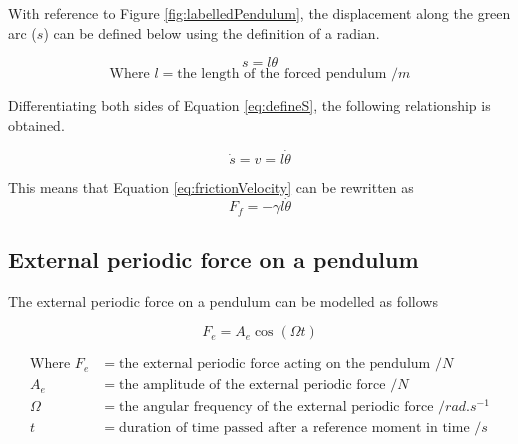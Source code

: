 \documentclass[letterpaper, 12pt]{article}
\begin{document}



With reference to Figure \ref*{fig:labelledPendulum}, the
displacement along the green arc (\(s\)) can be defined
below using the definition of a radian.

\begin{equation} \label{eq:defineS}
    s = l\theta
\end{equation}
\[
    \text{Where } l = \text{the length of the forced pendulum } /\unit{m}
\]

Differentiating both sides of Equation \ref*{eq:defineS},
the following relationship is obtained.

\begin{equation}
    \dot s = v = l \dot \theta
\end{equation}

This means that Equation \ref*{eq:frictionVelocity} can be rewritten as
\begin{equation}
    F_f = -\gamma l \dot\theta
\end{equation}

\subsection{External periodic force on a pendulum}

The external periodic force on a pendulum can be modelled as follows

\begin{equation}
    F_e = A_e \cos (\Omega t)
\end{equation}

\begin{align*}
    \text{Where } F_e & = \text{the external periodic force acting on the pendulum } /\unit{N}
    \\
    A_e               & = \text{the amplitude of the external periodic force } /\unit{N}
    \\
    \Omega            & = \text{the angular frequency of the external periodic force } /\unit{rad.s^{-1}}
    \\
    t                 & = \text{duration of time passed after a reference moment in time } /\unit{s}
\end{align*}
\end{document}
